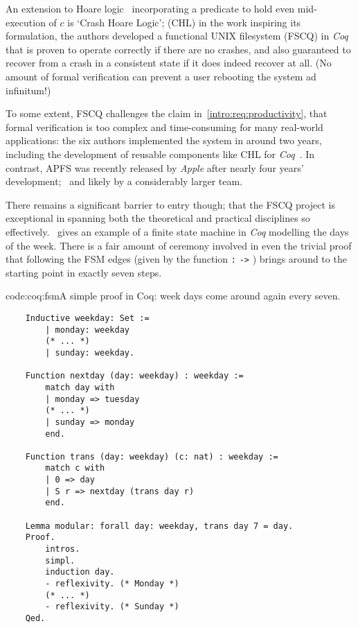 An extension to Hoare logic~ incorporating a predicate to hold even mid-execution of $c$ is `Crash Hoare Logic'; (CHL) in the work inspiring its formulation, the authors developed a functional UNIX filesystem (FSCQ) in \emph{Coq} that is proven to operate correctly if there are no crashes, and also guaranteed to recover from a crash in a consistent state if it does indeed recover at all. \cite{fscq} (No amount of formal verification can prevent a user rebooting the system ad infinitum!)

To some extent, FSCQ challenges the claim in~\cref{intro:req:productivity}, that formal verification is too complex and time-consuming for many real-world applications: the six authors implemented the system in around two years, including the development of reusable components like CHL for \emph{Coq}~\cite{fscq}. In contrast, APFS was recently released by \emph{Apple} after nearly four years' development;~\cite{apfs_detail} and likely by a considerably larger team.

There remains a significant barrier to entry though; that the FSCQ project is exceptional in spanning both the theoretical and practical disciplines so effectively.~\cite{soft_eng_possible}  gives an example of a finite state machine in \emph{Coq} modelling the days of the week. There is a fair amount of ceremony involved in even the trivial proof that following the FSM edges (given by the function \texttt{:}  \texttt{->} ) brings around to the starting point in exactly seven steps.

\begin{codelisting}{code:coq:fsm}{A simple proof in Coq: week days come around again every seven.}
\begin{verbatim}
    Inductive weekday: Set :=
        | monday: weekday
        (* ... *)
        | sunday: weekday.
    
    Function nextday (day: weekday) : weekday :=
        match day with
        | monday => tuesday
        (* ... *)
        | sunday => monday
        end.
    
    Function trans (day: weekday) (c: nat) : weekday :=
        match c with
        | 0 => day
        | S r => nextday (trans day r)
        end.
    
    Lemma modular: forall day: weekday, trans day 7 = day.
    Proof.
        intros.
        simpl.
        induction day.
        - reflexivity. (* Monday *)
        (* ... *)
        - reflexivity. (* Sunday *)
    Qed.
\end{verbatim}
\end{codelisting}

